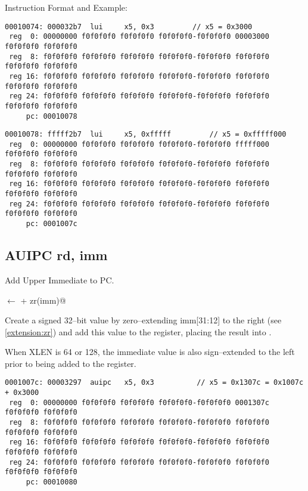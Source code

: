 Instruction Format and Example:


\begin{verbatim}
00010074: 000032b7  lui     x5, 0x3         // x5 = 0x3000
 reg  0: 00000000 f0f0f0f0 f0f0f0f0 f0f0f0f0-f0f0f0f0 00003000 f0f0f0f0 f0f0f0f0
 reg  8: f0f0f0f0 f0f0f0f0 f0f0f0f0 f0f0f0f0-f0f0f0f0 f0f0f0f0 f0f0f0f0 f0f0f0f0
 reg 16: f0f0f0f0 f0f0f0f0 f0f0f0f0 f0f0f0f0-f0f0f0f0 f0f0f0f0 f0f0f0f0 f0f0f0f0
 reg 24: f0f0f0f0 f0f0f0f0 f0f0f0f0 f0f0f0f0-f0f0f0f0 f0f0f0f0 f0f0f0f0 f0f0f0f0
     pc: 00010078
\end{verbatim}


\begin{verbatim}
00010078: fffff2b7  lui     x5, 0xfffff         // x5 = 0xfffff000
 reg  0: 00000000 f0f0f0f0 f0f0f0f0 f0f0f0f0-f0f0f0f0 fffff000 f0f0f0f0 f0f0f0f0
 reg  8: f0f0f0f0 f0f0f0f0 f0f0f0f0 f0f0f0f0-f0f0f0f0 f0f0f0f0 f0f0f0f0 f0f0f0f0
 reg 16: f0f0f0f0 f0f0f0f0 f0f0f0f0 f0f0f0f0-f0f0f0f0 f0f0f0f0 f0f0f0f0 f0f0f0f0
 reg 24: f0f0f0f0 f0f0f0f0 f0f0f0f0 f0f0f0f0-f0f0f0f0 f0f0f0f0 f0f0f0f0 f0f0f0f0
     pc: 0001007c
\end{verbatim}


\subsection{AUIPC rd, imm}

Add Upper Immediate to PC.

\verb@rd@ $\leftarrow$ \verb@pc + zr(imm)@

Create a signed 32--bit value by zero--extending imm[31:12] to the 
right (see \autoref{extension:zr}) and add this value to the 
 register, placing the result into .

When XLEN is 64 or 128, the immediate value is also sign--extended 
to the left prior to being added to the  register.

\begin{verbatim}
0001007c: 00003297  auipc   x5, 0x3          // x5 = 0x1307c = 0x1007c + 0x3000
 reg  0: 00000000 f0f0f0f0 f0f0f0f0 f0f0f0f0-f0f0f0f0 0001307c f0f0f0f0 f0f0f0f0
 reg  8: f0f0f0f0 f0f0f0f0 f0f0f0f0 f0f0f0f0-f0f0f0f0 f0f0f0f0 f0f0f0f0 f0f0f0f0
 reg 16: f0f0f0f0 f0f0f0f0 f0f0f0f0 f0f0f0f0-f0f0f0f0 f0f0f0f0 f0f0f0f0 f0f0f0f0
 reg 24: f0f0f0f0 f0f0f0f0 f0f0f0f0 f0f0f0f0-f0f0f0f0 f0f0f0f0 f0f0f0f0 f0f0f0f0
     pc: 00010080
\end{verbatim}


